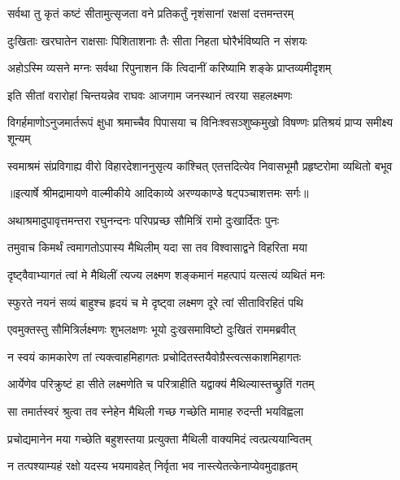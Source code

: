 \twolineshloka
{सर्वथा तु कृतं कष्टं सीतामुत्सृजता वने}
{प्रतिकर्तुं नृशंसानां रक्षसां दत्तमन्तरम्} %

\twolineshloka
{दुःखिताः खरघातेन राक्षसाः पिशिताशनाः}
{तैः सीता निहता घोरैर्भविष्यति न संशयः} %

\twolineshloka
{अहोऽस्मि व्यसने मग्नः सर्वथा रिपुनाशन}
{किं त्विदानीं करिष्यामि शङ्के प्राप्तव्यमीदृशम्} %

\twolineshloka
{इति सीतां वरारोहां चिन्तयन्नेव राघवः}
{आजगाम जनस्थानं त्वरया सहलक्ष्मणः} %

\fourlineindentedshloka
{विगर्हमाणोऽनुजमार्तरूपं}
{ क्षुधा श्रमाच्चैव पिपासया च}
{विनिःश्वसञ्शुष्कमुखो विषण्णः}
{ प्रतिश्रयं प्राप्य समीक्ष्य शून्यम्} %

\fourlineindentedshloka
{स्वमाश्रमं संप्रविगाह्य वीरो}
{ विहारदेशाननुसृत्य कांश्चित्}
{एतत्तदित्येव निवासभूमौ}
{ प्रहृष्टरोमा व्यथितो बभूव} %


{॥इत्यार्षे श्रीमद्रामायणे वाल्मीकीये आदिकाव्ये अरण्यकाण्डे षट्पञ्चाशत्तमः सर्गः॥}


\twolineshloka
{अथाश्रमादुपावृत्तमन्तरा रघुनन्दनः}
{परिपप्रच्छ सौमित्रिं रामो दुःखार्दितः पुनः} %

\twolineshloka
{तमुवाच किमर्थं त्वमागतोऽपास्य मैथिलीम्}
{यदा सा तव विश्वासाद्वने विहरिता मया} %

\twolineshloka
{दृष्ट्वैवाभ्यागतं त्वां मे मैथिलीं त्यज्य लक्ष्मण}
{शङ्कमानं महत्पापं यत्सत्यं व्यथितं मनः} %

\twolineshloka
{स्फुरते नयनं सव्यं बाहुश्च हृदयं च मे}
{दृष्ट्वा लक्ष्मण दूरे त्वां सीताविरहितं पथि} %

\twolineshloka
{एवमुक्तस्तु सौमित्रिर्लक्ष्मणः शुभलक्षणः}
{भूयो दुःखसमाविष्टो दुःखितं राममब्रवीत्} %

\twolineshloka
{न स्वयं कामकारेण तां त्यक्त्वाहमिहागतः}
{प्रचोदितस्तयैवोग्रैस्त्वत्सकाशमिहागतः} %

\twolineshloka
{आर्येणेव परिक्रुष्टं हा सीते लक्ष्मणेति च}
{परित्राहीति यद्वाक्यं मैथिल्यास्तच्छ्रुतिं गतम्} %

\twolineshloka
{सा तमार्तस्वरं श्रुत्वा तव स्नेहेन मैथिली}
{गच्छ गच्छेति मामाह रुदन्ती भयविह्वला} %

\twolineshloka
{प्रचोद्यमानेन मया गच्छेति बहुशस्तया}
{प्रत्युक्ता मैथिली वाक्यमिदं त्वत्प्रत्ययान्वितम्} %

\twolineshloka
{न तत्पश्याम्यहं रक्षो यदस्य भयमावहेत्}
{निर्वृता भव नास्त्येतत्केनाप्येवमुदाहृतम्} %

